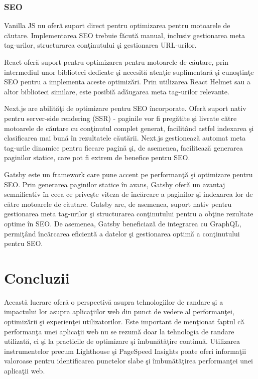 \documentclass[12pt, a4paper]{report}
\begin{document}
\subsection{SEO}

Vanilla JS nu ofer\u a suport direct pentru optimizarea pentru motoarele de c\u autare. Implementarea SEO trebuie f\u acut\u a manual, inclusiv gestionarea meta tag-urilor, structurarea con\c tinutului \c si gestionarea URL-urilor.

React ofer\u a suport pentru optimizarea pentru motoarele de c\u autare, prin intermediul unor biblioteci dedicate \c si necesit\u a aten\c tie suplimentar\u a \c si cuno\c stin\c te SEO pentru a implementa aceste optimiz\u ari. Prin utilizarea React Helmet sau a altor biblioteci similare, este posibi\u a ad\u augarea meta tag-urilor relevante.

Next.js are abilit\u a\c ti de optimizare pentru SEO \^incorporate. Ofer\u a suport nativ pentru server-side rendering (SSR) - paginile vor fi preg\u atite \c si livrate c\u atre motoarele de c\u autare cu con\c tinutul complet generat, facilit\^and astfel indexarea \c si clasificarea mai bun\u a \^in rezultatele c\u aut\u arii. Next.js gestioneaz\u a automat meta tag-urile dinamice pentru fiecare pagin\u a \c si, de asemenea, faciliteaz\u a generarea paginilor statice, care pot fi extrem de benefice pentru SEO.

Gatsby este un framework care pune accent pe performan\c t\u a \c si optimizare pentru SEO. Prin generarea paginilor statice \^in avans, Gatsby ofer\u a un avantaj semnificativ \^in ceea ce prive\c ste viteza de \^inc\u arcare a paginilor \c si indexarea lor de c\u atre motoarele de c\u autare. Gatsby are, de asemenea, suport nativ pentru gestionarea meta tag-urilor \c si structurarea con\c tinutului pentru a ob\c tine rezultate optime \^in SEO. De asemenea, Gatsby beneficiaz\u a de integrarea cu GraphQL, permi\c t\^and \^inc\u arcarea eficient\u a a datelor \c si gestionarea optim\u a a con\c tinutului pentru SEO.

\chapter{Concluzii}

Aceast\u a lucrare ofer\u a o perspectiv\u a asupra tehnologiilor de randare \c si a impactului lor asupra aplica\c tiilor web din punct de vedere al performan\c tei, optimiz\u arii \c si experien\c tei utilizatorilor.
Este important de men\c tionat faptul c\u a performan\c ta unei aplica\c tii web nu se rezum\u a doar la tehnologia de randare utilizat\u a, ci \c si la practicile de optimizare \c si \^imbun\u at\u a\c tire continu\u a. Utilizarea instrumentelor precum Lighthouse \c si PageSpeed Insights poate oferi informa\c tii valoroase pentru identificarea punctelor slabe \c si \^imbun\u at\u a\c tirea performan\c tei unei aplica\c tii web.
\end{document}
